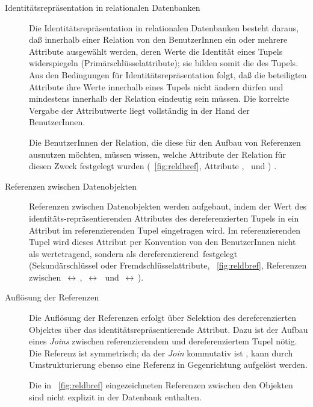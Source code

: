 \begin{description}
%
\item[Identit\"{a}tsrepr\"{a}sentation in relationalen Datenbanken]
Die Identit\"{a}tsrepr\"{a}sentation in relationalen Datenbanken besteht
daraus, da\ss{} innerhalb einer Relation von den BenutzerInnen ein oder
mehrere Attribute ausgew\"{a}hlt werden, deren Werte die Identit\"{a}t eines
Tupels widerspiegeln (Prim\"{a}rschl\"{u}sselattribute); sie bilden somit
die \objid\/ des Tupels.  Aus den Bedingungen f\"{u}r
Iden\-ti\-t\"{a}ts\-re\-pr\"{a}\-sen\-ta\-tion folgt, da\ss{} die beteiligten
Attribute ihre Werte innerhalb eines Tupels nicht \"{a}ndern d\"{u}rfen und
mindestens innerhalb der Relation eindeutig sein m\"{u}ssen. Die korrekte
Vergabe der Attributwerte liegt vollst\"{a}ndig in der Hand der
BenutzerInnen.
%
\par{}Die BenutzerInnen der Relation, die diese
\objid\/ f\"{u}r den Aufbau von Referenzen ausnutzen m\"{o}chten, m\"{u}ssen
wissen, welche Attribute der Relation f\"{u}r diesen Zweck festgelegt
wurden (\figurename~\ref{fig:reldbref}, Attribute \oi, \oiii\ und \ov)
\cite[]{bib:schl83}.
%
\item[Referenzen zwischen Datenobjekten]
Referenzen zwischen Datenobjekten werden aufgebaut,
indem der Wert des iden\-ti\-t\"{a}ts-re\-pr\"{a}\-sen\-tie\-ren\-den
Attributes des dereferenzierten Tupels in ein Attribut im
referenzierenden Tupel eingetragen wird. Im referenzierenden Tupel
wird dieses Attribut per Konvention von den BenutzerInnen nicht als
\rglq{}wertetragend\rgrq, sondern als
\rglq{}dereferenzierend\rgrq\ festgelegt (Sekund\"{a}rschl\"{u}ssel
oder Fremdschl\"{u}sselattribute, \figurename~\ref{fig:reldbref},
Referenzen zwischen
\oii\,$\leftrightarrow$\,\oiii, \oiii\,$\leftrightarrow$\,\ovi\ und
\oiv\,$\leftrightarrow$\,\ov).
%
\item[Aufl\"{o}sung der Referenzen]
Die Aufl\"{o}sung der Referenzen erfolgt \"{u}ber Selektion des
dereferenzierten Objektes \"{u}ber das identit\"{a}tsrepr\"{a}sentierende
Attribut. Dazu ist der Aufbau eines {\em Joins\/} zwischen
referenzierendem und dereferenziertem Tupel n\"{o}tig. Die Referenz ist
symmetrisch; da der {\em Join\/} kommutativ ist \cite[]{bib:schl83}, kann durch Umstrukturierung ebenso eine Referenz in
Gegenrichtung aufgel\"{o}st werden.
%
\par{}Die in \figurename~\ref{fig:reldbref} eingezeichneten Referenzen
zwischen den Objekten sind nicht explizit in der Datenbank enthalten.
%
\end{description}
